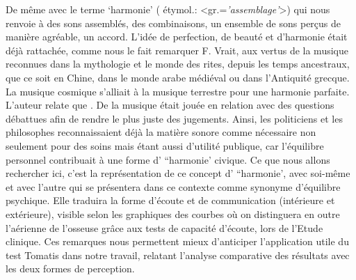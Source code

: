 De même avec le terme `harmonie' ( étymol.:
<gr.=\textit{'assemblage'}>) qui nous renvoie à
 des sons assemblés, des combinaisons, un ensemble de sons perçus de
 manière agréable, un accord. L'idée de perfection, de beauté et d'harmonie était déjà rattachée, comme 
 nous le fait remarquer F. Vrait, aux  vertus de la musique reconnues dans la mythologie et le
 monde des rites, depuis les temps ancestraux, que ce soit en Chine, dans le monde arabe
 médiéval ou dans l'Antiquité grecque. La musique cosmique s'alliait  à la musique terrestre pour une harmonie parfaite.
 L'auteur relate que  \autocite[80]{vrait_musicotherapie_2018}. De la musique était jouée en relation avec des questions débattues afin de rendre le plus juste des jugements.
Ainsi, les  politiciens  et les
philosophes reconnaissaient déjà la matière sonore comme nécessaire non seulement pour  des soins 
mais étant aussi d'utilité
publique, car l'équilibre personnel contribuait à une forme d' ``harmonie' civique.
Ce que nous allons rechercher ici, c'est la représentation de ce concept d' ``harmonie', avec soi-même 
et 
avec l'autre qui se présentera dans ce contexte comme synonyme d'équilibre
psychique. Elle traduira la forme d'écoute et de communication (intérieure et
extérieure), visible selon les graphiques %
 des courbes %
 où on distinguera en outre l'aérienne de l'osseuse grâce aux tests de capacité 
 d'écoute, lors de l'Etude clinique.
Ces remarques nous permettent mieux d'anticiper
l'application utile du test Tomatis dans notre travail, relatant l'analyse
comparative des résultats avec les deux formes de perception.



